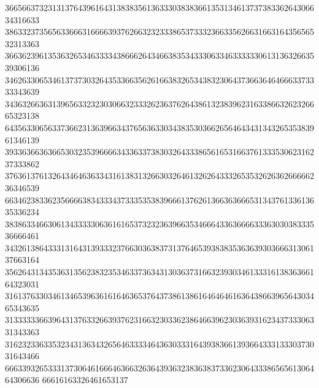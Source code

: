 36656637323131376439616431383835613633303838366135313461373738336264306634316633
38633237356563366631666639376266323233386537333236633562663166316435656532313363
36636239613536326534633334386662643466383534333063346333333061313632663539306136
34626330653461373730326435336635626166383265343832306437366364646663373333343639
34363266363139656332323030663233326236376264386132383962316338663262326665323138
64356330656337366231363966343765636330343835303662656464343134326535383961346139
39336366363665303235396666343363373830326433386561653166376133353062316237333862
37636137613264346463633431613831326630326461326264333265353262636266666236346539
66346238336235666638343334373335353839666137626136636366653134376133613635336234
38386334663061343333306361616537323236396635346664336366663336303038333536666461
34326138643331316431393332376630363837313764653938383536363930366631306137663164
35626431343536313562383235346337363431303637316632393034613331613836366164323031
31613763303461346539636161646365376437386138616464646163643866396564303465343635
31333333663964313763326639376231663230336238646639623036393162343733306331343363
31623233633532343136343265646333346436303331643938366139366433313330373031643466
66633932653331373064616664636632636439363238363837336230643338656561306464306636
66616163326461653137

